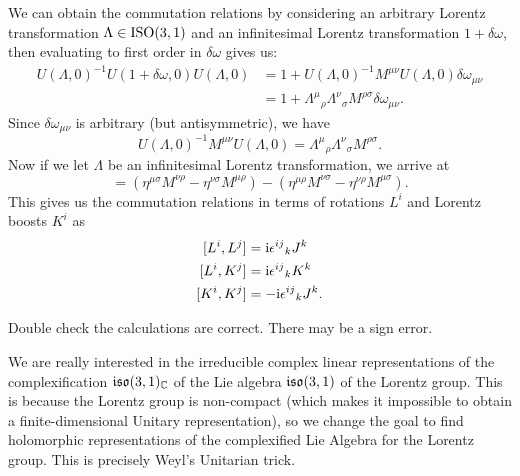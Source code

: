 \label{chunk:rqm:poincare-algebra:lorentz-algebra:commutation-relations}
We can obtain the commutation relations by considering an arbitrary
Lorentz transformation $\Lambda\in\mathrm{ISO}(3,1)$ and an infinitesimal
Lorentz transformation $1+\delta\omega$, then evaluating to first order
in $\delta\omega$ gives us:
\begin{subequations}
\begin{align}
  U(\Lambda,0)^{-1}U(1 + \delta\omega,0)U(\Lambda,0)
  &= 1+U(\Lambda,0)^{-1}M^{\mu\nu}U(\Lambda,0)\delta\omega_{\mu\nu}\\
  &= 1+{\Lambda^{\mu}}_{\rho}{\Lambda^{\nu}}_{\sigma}M^{\rho\sigma}\delta\omega_{\mu\nu}.
\end{align}
\end{subequations}
Since $\delta\omega_{\mu\nu}$ is arbitrary (but antisymmetric), we have
\begin{equation}
U(\Lambda,0)^{-1}M^{\mu\nu}U(\Lambda,0)
= {\Lambda^{\mu}}_{\rho}{\Lambda^{\nu}}_{\sigma}M^{\rho\sigma}.
\end{equation}
Now if we let $\Lambda$ be an infinitesimal Lorentz transformation, we
arrive at
\begin{equation}
[M^{\mu\nu}, M^{\rho\sigma}]
= (\eta^{\mu\sigma}M^{\nu\rho} - \eta^{\nu\sigma}M^{\mu\rho})
- (\eta^{\mu\rho}M^{\nu\sigma} - \eta^{\nu\rho}M^{\mu\sigma}).
\end{equation}
This gives us the commutation relations in terms of rotations $L^{i}$
and Lorentz boosts $K^{i}$ as
\begin{subequations}
\begin{align}
[L^{i}, L^{j}] &= \mathrm{i}{\epsilon^{ij}}_{k}J^{k}\\
[L^{i}, K^{j}] &= \mathrm{i}{\epsilon^{ij}}_{k}K^{k}\\
[K^{i}, K^{j}] &= -\mathrm{i}{\epsilon^{ij}}_{k}J^{k}.
\end{align}
\end{subequations}

\begin{exercise}
Double check the calculations are correct. There may be a sign error.
\end{exercise}

We are really interested in the irreducible complex linear
representations of the complexification $\mathfrak{iso}(3,1)_{\mathbb{C}}$ of the Lie
algebra $\mathfrak{iso}(3,1)$ of the Lorentz group. This is because the Lorentz
group is non-compact (which makes it impossible to obtain a
finite-dimensional Unitary representation), so we change the goal to
find holomorphic representations of the complexified Lie Algebra for the
Lorentz group. This is precisely Weyl's Unitarian trick.

